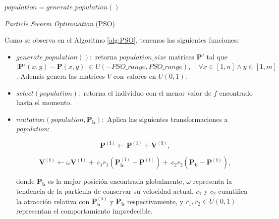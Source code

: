 \begin{algorithm}
{}
$population = generate\_population()$ \\
\caption{\emph{Particle Swarm Optimization} (PSO)}
\label{alg:PSO}
\end{algorithm}

Como se observa en el Algoritmo \ref{alg:PSO}, tenemos las siguientes funciones:

\begin{itemize}

    \item $generate\_population():$ 
      retorna $population\_size$ matrices 
      $\boldsymbol{P'}$ tal que 
      $|\boldsymbol{P'}(x, y) - \boldsymbol{P}(x, y)| \in U(-PSO\_range, PSO\_range), \quad \forall x \in [1, n]
      \land y \in [1, m]$. Además genera las matrices $V$ con valores en $U(0, 1)$.

\item $select(population):$ retorna el individuo con el menor valor de $f$ encontrado hasta el momento.

\item $mutation(population, \boldsymbol{P_b}):$ Aplica las siguientes transformaciones a \emph{population}: 
    
  \begin{equation}
    \boldsymbol{P^{(i)}} \gets \boldsymbol{P^{(i)}} + \boldsymbol{V^{(i)}},
  \label{pso-pos}
  \end{equation}

  \begin{equation}
    \boldsymbol{V^{(i)}} \gets \omega \boldsymbol{V^{(i)}} + \
                          c_1 r_1 \left(\boldsymbol{P_{b}^{(i)}} - \boldsymbol{P^{(i)}} \right) + \
                          c_2 r_2 \left(\boldsymbol{P_{b}} - \boldsymbol{P^{(i)}} \right),
  \label{pso-speed}
  \end{equation}
    

  donde $\boldsymbol{P_{b}}$  es la mejor posición encontrada globalmente, 
  $\omega$ representa la tendencia de la partícula de conservar su velocidad actual,
  $c_1$ y $c_2$ cuantifica la atracción relativa con $\boldsymbol{P_{b}^{(i)}}$ y 
  $\boldsymbol{P_{b}}$ respectivamente, 
  y $r_1, r_2 \in U(0, 1)$ representan el comportamiento impredecible.


\end{itemize}

